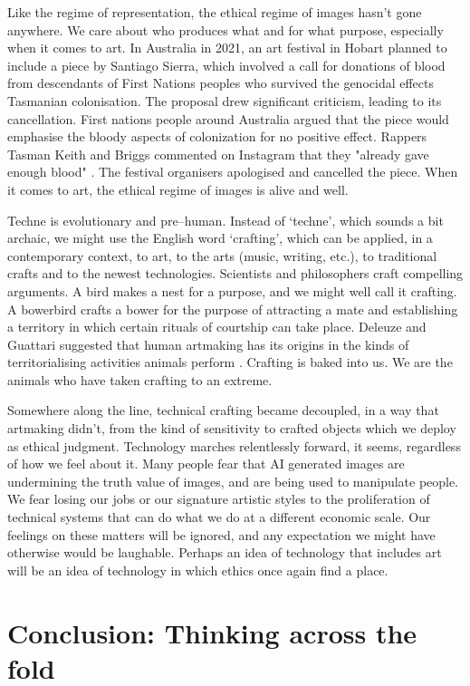 \documentclass[letterpaper]{article}
\begin{document}
    Like the regime of representation, the ethical regime of images hasn't gone anywhere. We care about who produces what and for what purpose, especially when it comes to art. In Australia in 2021, an art festival in Hobart planned to include a piece by Santiago Sierra, which involved a call for donations of blood from descendants of First Nations peoples who survived the genocidal effects Tasmanian colonisation. The proposal drew significant criticism, leading to its cancellation. First nations people around Australia argued that the piece would emphasise the bloody aspects of colonization for no positive effect. Rappers Tasman Keith and Briggs commented on Instagram that they "already gave enough blood" \citep{DrkMfBld2021}. The festival organisers apologised and cancelled the piece. When it comes to art, the ethical regime of images is alive and well.

    Techne is evolutionary and pre–human. Instead of ‘techne’, which sounds a bit archaic, we might use the English word ‘crafting’, which can be applied, in a contemporary context, to art, to the arts (music, writing, etc.), to traditional crafts and to the newest technologies. Scientists and philosophers craft compelling arguments. A bird makes a nest for a purpose, and we might well call it crafting. A bowerbird crafts a bower for the purpose of attracting a mate and establishing a territory in which certain rituals of courtship can take place. Deleuze and Guattari suggested that human artmaking has its origins in the kinds of territorialising activities animals perform \citep[p.15]{GuattariChsmss1995}. Crafting is baked into us. We are the animals who have taken crafting to an extreme.

    Somewhere along the line, technical crafting became decoupled, in a way that artmaking didn't, from the kind of sensitivity to crafted objects which we deploy as ethical judgment. Technology marches relentlessly forward, it seems, regardless of how we feel about it. Many people fear that AI generated images are undermining the truth value of images, and are being used to manipulate people. We fear losing our jobs or our signature artistic styles to the proliferation of technical systems that can do what we do at a different economic scale. Our feelings on these matters will be ignored, and any expectation we might have otherwise would be laughable. Perhaps an idea of technology that includes art will be an idea of technology in which ethics once again find a place.
    
\section{Conclusion: Thinking across the fold}
\end{document}
